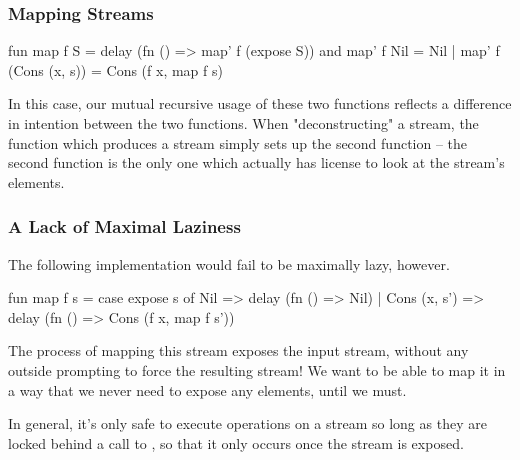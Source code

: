 \documentclass[aspectratio=169, handout]{beamer}
\begin{document}
\begin{frame}[fragile]
  \frametitle{Mapping Streams}

  \begin{codeblock}
    fun map  f S = delay (fn () => map' f (expose S))
    and map' f Nil = Nil
      | map' f (Cons (x, s)) = Cons (f x, map f s)
  \end{codeblock}

  \pause
  \vspace{\fill}

  In this case, our mutual recursive usage of these two functions reflects a
  difference in intention between the two functions. When "deconstructing" a
  stream, the function which produces a stream simply sets up the second
  function -- the second function is the only one which actually has license
  to look at the stream's elements.
\end{frame}

\begin{frame}[fragile]
  \frametitle{A Lack of Maximal Laziness}

  The following implementation would fail to be maximally lazy, however.

  \pause
  \vspace{\fill}

  \begin{codeblock}
    fun map f s =
      case expose s of
        Nil => delay (fn () => Nil)
      | Cons (x, s') => delay (fn () => Cons (f x, map f s'))
  \end{codeblock}

  \pause
  \vspace{\fill}

  The process of mapping this stream exposes the input stream, without any
  outside prompting to force the resulting stream! We want to be
  able to map it in a way that we never need to expose any elements, until
  we must.

  \pause
  \vspace{\fill}

  In general, it's only safe to execute operations on a stream so long as
  they are locked behind a call to , so that it only occurs
  once the stream is exposed.
\end{frame}
\end{document}
